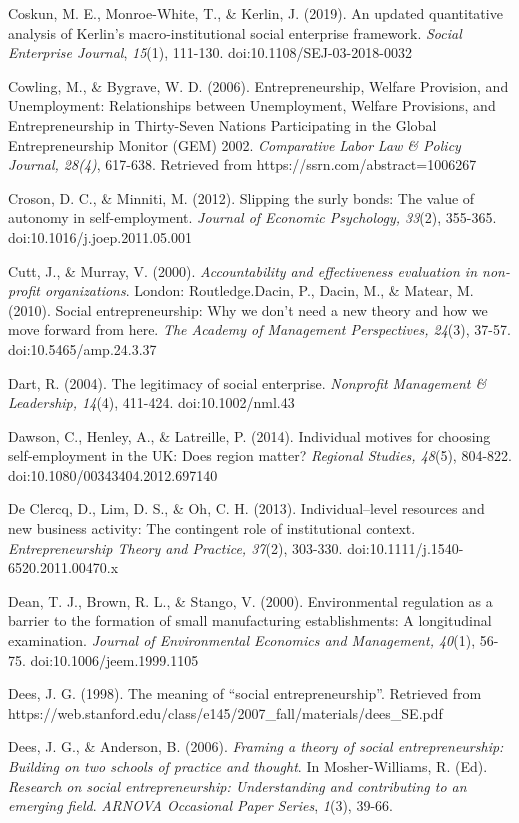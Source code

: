 \documentclass{article}
\begin{document}
Coskun, M. E., Monroe-White, T., \& Kerlin, J. (2019). An updated quantitative analysis of Kerlin's macro-institutional social enterprise framework. \emph{Social Enterprise Journal}, \emph{15}(1), 111-130. doi:10.1108/SEJ-03-2018-0032

Cowling, M., \& Bygrave, W. D. (2006). Entrepreneurship, Welfare Provision, and Unemployment: Relationships between Unemployment, Welfare Provisions, and Entrepreneurship in Thirty-Seven Nations Participating in the Global Entrepreneurship Monitor (GEM) 2002. \emph{Comparative }\emph{Labor}\emph{ Law \& Policy Journal, 28(4)}, 617-638. Retrieved from https://ssrn.com/abstract=1006267

Croson, D. C., \& Minniti, M. (2012). Slipping the surly bonds: The value of autonomy in self-employment. \emph{Journal of Economic Psychology, 33}(2), 355-365. doi:10.1016/j.joep.2011.05.001

Cutt, J., \& Murray, V. (2000). \emph{Accountability and effectiveness evaluation in non-profit organizations}. London: Routledge.Dacin, P., Dacin, M., \& Matear, M. (2010). Social entrepreneurship: Why we don't need a new theory and how we move forward from here. \emph{The Academy of Management Perspectives, 24}(3), 37-57. doi:10.5465/amp.24.3.37

Dart, R. (2004). The legitimacy of social enterprise. \emph{Nonprofit}\emph{ Management \& Leadership, 14}(4), 411-424. doi:10.1002/nml.43

Dawson, C., Henley, A., \& Latreille, P. (2014). Individual motives for choosing self-employment in the UK: Does region matter? \emph{Regional Studies, 48}(5), 804-822. doi:10.1080/00343404.2012.697140

De Clercq, D., Lim, D. S., \& Oh, C. H. (2013). Individual--level resources and new business activity: The contingent role of institutional context. \emph{Entrepreneurship Theory and Practice, 37}(2), 303-330. doi:10.1111/j.1540-6520.2011.00470.x

Dean, T. J., Brown, R. L., \& Stango, V. (2000). Environmental regulation as a barrier to the formation of small manufacturing establishments: A longitudinal examination. \emph{Journal of Environmental Economics and Management, 40}(1), 56-75. doi:10.1006/jeem.1999.1105

Dees, J. G. (1998). The meaning of “social entrepreneurship”. Retrieved from https://web.stanford.edu/class/e145/2007\_fall/materials/dees\_SE.pdf

Dees, J. G., \& Anderson, B. (2006). \emph{Framing a theory of social entrepreneurship: Building on two schools of practice and thought}. In Mosher-Williams, R. (Ed). \emph{Research on social entrepreneurship: Understanding and contributing to an emerging field}. \emph{ARNOVA Occasional Paper Series}, \emph{1}(3), 39-66. 
\end{document}

